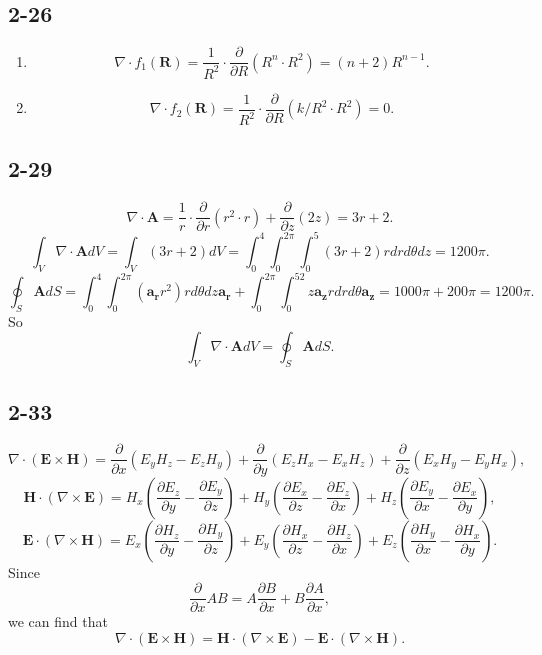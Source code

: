 \documentclass[11pt,a4paper]{article}
\begin{document}
\subsection{2-26}
\begin{enumerate}[label=\alph*)]
\item
$$\nabla\cdot f_1(\mathbf{R})=\frac{1}{R^2}\cdot\frac{\partial}{\partial R}(R^n\cdot R^2)=(n+2)R^{n-1}.$$
\item
$$\nabla\cdot f_2(\mathbf{R})=\frac{1}{R^2}\cdot\frac{\partial}{\partial R}(k/R^2\cdot R^2)=0.$$
\end{enumerate}

\subsection{2-29}
$$\nabla\cdot\mathbf{A}=\frac{1}{r}\cdot\frac{\partial}{\partial r}(r^2\cdot r)+\frac{\partial}{\partial z}(2z)=3r+2.$$
$$\int_V\nabla\cdot\mathbf{A}dV=\int_V(3r+2)dV=\int_0^4\int_0^{2\pi}\int_0^5(3r+2)rdrd\theta dz=1200\pi.$$
$$\oint_S\mathbf{A}dS=\int_0^4\int_0^{2\pi}(\mathbf{a_r}r^2)rd\theta dz\mathbf{a_r}+\int_0^{2\pi}\int_0^52z\mathbf{a_z}rdrd\theta\mathbf{a_z}=1000\pi+200\pi=1200\pi.$$
So $$\int_V\nabla\cdot\mathbf{A}dV=\oint_S\mathbf{A}dS.$$

\subsection{2-33}
$$\nabla\cdot(\mathbf{E}\times\mathbf{H})=\frac{\partial}{\partial x}(E_yH_z-E_zH_y)+\frac{\partial}{\partial y}(E_zH_x-E_xH_z)+\frac{\partial}{\partial z}(E_xH_y-E_yH_x),$$
$$\mathbf{H}\cdot(\nabla\times\mathbf{E})=H_x\left(\frac{\partial E_z}{\partial y}-\frac{\partial E_y}{\partial z}\right)+H_y\left(\frac{\partial E_x}{\partial z}-\frac{\partial E_z}{\partial x}\right)+H_z\left(\frac{\partial E_y}{\partial x}-\frac{\partial E_x}{\partial y}\right),$$
$$\mathbf{E}\cdot(\nabla\times\mathbf{H})=E_x\left(\frac{\partial H_z}{\partial y}-\frac{\partial H_y}{\partial z}\right)+E_y\left(\frac{\partial H_x}{\partial z}-\frac{\partial H_z}{\partial x}\right)+E_z\left(\frac{\partial H_y}{\partial x}-\frac{\partial H_x}{\partial y}\right).$$
Since
$$\frac{\partial}{\partial x}AB=A\frac{\partial B}{\partial x}+B\frac{\partial A}{\partial x},$$
we can find that
$$\nabla\cdot(\mathbf{E}\times\mathbf{H})=\mathbf{H}\cdot(\nabla\times\mathbf{E})-\mathbf{E}\cdot(\nabla\times\mathbf{H}).$$
\end{document}
